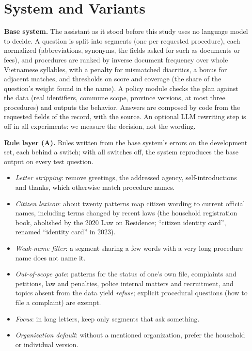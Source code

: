 \section{System and Variants}\label{sec:method}

\textbf{Base system.} The assistant as it stood before this study uses no language model to decide. A question is split into segments (one
per requested procedure), each normalized (abbreviations, synonyms, the fields asked for such as documents or fees), and procedures are
ranked by inverse document frequency over whole Vietnamese syllables\cite{robertson2009}, with a penalty for mismatched diacritics, a bonus
for adjacent matches, and thresholds on score and coverage (the share of the question's weight found in the name). A policy module checks
the plan against the data (real identifiers, commune scope, province versions, at most three procedures) and outputs the behavior. Answers
are composed by code from the requested fields of the record, with the source. An optional LLM rewriting step is off in all experiments:
we measure the decision, not the wording.

\textbf{Rule layer (A).} Rules written from the base system's errors on the development set, each behind a switch; with all switches off,
the system reproduces the base output on every test question.
\begin{itemize}
\item \emph{Letter stripping}: remove greetings, the addressed agency, self-introductions and thanks, which otherwise match procedure names.
\item \emph{Citizen lexicon}: about twenty patterns map citizen wording to current official names, including terms changed by recent laws
(the household registration book, abolished by the 2020 Law on Residence; ``citizen identity card'', renamed ``identity card'' in 2023).
\item \emph{Weak-name filter}: a segment sharing a few words with a very long procedure name does not name it.
\item \emph{Out-of-scope gate}: patterns for the status of one's own file, complaints and petitions, law and penalties, police internal
matters and recruitment, and topics absent from the data yield \emph{refuse}; explicit procedural questions (how to file a complaint) are
exempt.
\item \emph{Focus}: in long letters, keep only segments that ask something.
\item \emph{Organization default}: without a mentioned organization, prefer the household or individual version.
\end{itemize}

